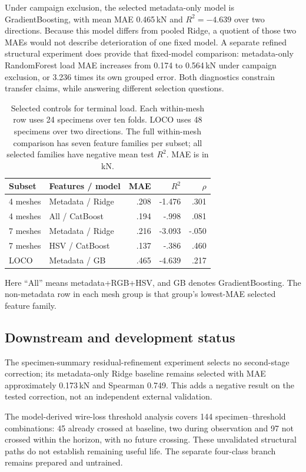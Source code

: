 \documentclass[conference]{IEEEtran}
\begin{document}
Under campaign exclusion, the selected metadata-only model is GradientBoosting, with mean MAE 0.465\,kN and $R^2=-4.639$ over two directions. Because this model differs from pooled Ridge, a quotient of those two MAEs would not describe deterioration of one fixed model. A separate refined structural experiment does provide that fixed-model comparison: metadata-only RandomForest load MAE increases from 0.174 to 0.564\,kN under campaign exclusion, or 3.236 times its own grouped error. Both diagnostics constrain transfer claims, while answering different selection questions.


\begin{table}[t]\centering
\caption{Selected controls for terminal load. Each within-mesh row uses 24 specimens over ten folds. LOCO uses 48 specimens over two directions. The full within-mesh comparison has seven feature families per subset; all selected families have negative mean test $R^2$. MAE is in kN.}\label{tab:controls}
\footnotesize
\begin{tabular}{llrrr}\toprule
Subset & Features / model & MAE & $R^2$ & $\rho$\\\midrule
4 meshes & Metadata / Ridge & .208 & -1.476 & .301\\
4 meshes & All / CatBoost & .194 & -.998 & .081\\
7 meshes & Metadata / Ridge & .216 & -3.093 & -.050\\
7 meshes & HSV / CatBoost & .137 & -.386 & .460\\
LOCO & Metadata / GB & .465 & -4.639 & .217\\\bottomrule
\end{tabular}
\end{table}
Here ``All'' means metadata+RGB+HSV, and GB denotes GradientBoosting. The non-metadata row in each mesh group is that group's lowest-MAE selected feature family.

\subsection{Downstream and development status}
The specimen-summary residual-refinement experiment selects no second-stage correction; its metadata-only Ridge baseline remains selected with MAE approximately 0.173\,kN and Spearman 0.749. This adds a negative result on the tested correction, not an independent external validation.

The model-derived wire-loss threshold analysis covers 144 specimen--threshold combinations: 45 already crossed at baseline, two during observation and 97 not crossed within the horizon, with no future crossing. These unvalidated structural paths do not establish remaining useful life. The separate four-class branch remains prepared and untrained.
\end{document}
